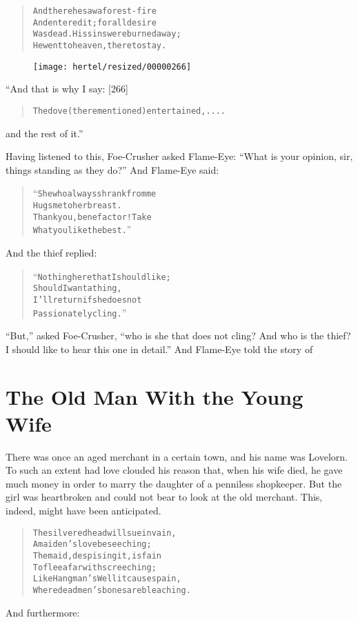 \documentclass[article, twoside, 10pt]{memoir}
\renewenvironment{verbatim}{%
\begin{quote}%
\vskip -10pt%
\begin{alltt}\normalfont\small}{\end{alltt}%
\end{quote}%
\vskip -10pt
} %
\begin{document}
\begin{verbatim}
And there he saw a forest-fire
And entered it; for all desire
Was dead. His sins were burned away;
He went to heaven, there to stay.
\end{verbatim}
\begin{figure}[p]\texttt{[image: hertel/resized/00000266]}\end{figure}“And that is why I say: [266]

\begin{verbatim}
The dove (there mentioned) entertained, ....
\end{verbatim}
and the rest of it.”

Having listened to this, Foe-Crusher asked Flame-Eye:
``What is your opinion, sir, things standing as they do?'' And
Flame-Eye said:

\begin{verbatim}
“She who always shrank from me
Hugs me to her breast.
Thank you, benefactor! Take
What you like the best.”
\end{verbatim}
And the thief replied:

\begin{verbatim}
“Nothing here that I should like;
Should I want a thing,
I'll return if she does not
Passionately cling.”
\end{verbatim}
``But,'' asked Foe-Crusher,
``who is she that does not cling? And who is the thief? I should like to hear this one in detail.''
And Flame-Eye told the story of

\chapter{The Old Man With the Young Wife}

There was once an aged merchant in a certain town, and his name was
Lovelorn. To such an extent had love clouded his reason that, when
his wife died, he gave much money in order to marry the daughter of
a penniless shopkeeper. But the girl was heartbroken and could not
bear to look at the old merchant. This, indeed, might have been
anticipated.

\begin{verbatim}
The silvered head will sue in vain,
    A maiden's love beseeching;
The maid, despising it, is fain
    To flee afar with screeching;
Like Hangman's Well it causes pain,
    Where dead men's bones are bleaching.
\end{verbatim}
And furthermore:
\end{document}
